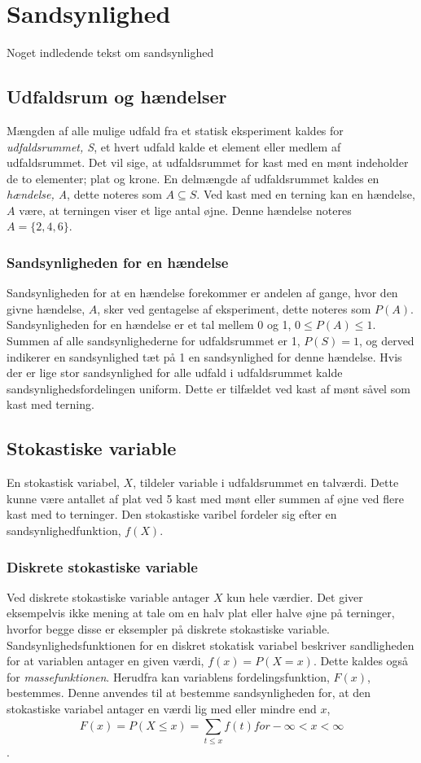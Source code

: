 \section{Sandsynlighed}
Noget indledende tekst om sandsynlighed

\subsection{Udfaldsrum og hændelser}
Mængden af alle mulige udfald fra et statisk eksperiment kaldes for \emph{udfaldsrummet,  S}, et hvert udfald kalde et element eller medlem af udfaldsrummet. Det vil sige, at udfaldsrummet for kast med en mønt indeholder de to elementer; plat og krone.
\newline
En delmængde af udfaldsrummet kaldes en \emph{hændelse, A}, dette noteres som $A \subseteq S$. Ved kast med en terning kan en hændelse, $A$ være, at terningen viser et lige antal øjne. Denne hændelse noteres $A=\{2,4,6\}$.


\subsubsection{Sandsynligheden for en hændelse}
Sandsynligheden for at en hændelse forekommer er andelen af gange, hvor den givne hændelse, $A$, sker ved gentagelse af eksperiment, dette noteres som $P(A)$. Sandsynligheden for en hændelse er et tal mellem 0 og 1, $0 \le P(A) \le 1$. Summen af alle sandsynlighederne for udfaldsrummet er 1, $P(S)=1$, og derved indikerer en sandsynlighed tæt på 1 en sandsynlighed for denne hændelse.
\newline
Hvis der er lige stor sandsynlighed for alle udfald i udfaldsrummet kalde sandsynlighedsfordelingen uniform. Dette er tilfældet ved kast af mønt såvel som kast med terning.


\subsection{Stokastiske variable}
En stokastisk variabel, $X$, tildeler variable i udfaldsrummet en talværdi. Dette kunne være antallet af plat ved 5 kast med mønt eller summen af øjne ved flere kast med to terninger. Den stokastiske varibel fordeler sig efter en sandsynlighedfunktion, $f(X)$.

\subsubsection{Diskrete stokastiske variable}
Ved diskrete stokastiske variable antager $X$ kun hele værdier. Det giver eksempelvis ikke mening at tale om en halv plat eller halve øjne på terninger, hvorfor begge disse er eksempler på diskrete stokastiske variable.
Sandsynlighedsfunktionen for en diskret stokatisk variabel beskriver sandligheden for at variablen antager en given værdi, $f(x)=P(X=x)$. Dette kaldes også for \emph{massefunktionen}.
Herudfra kan variablens fordelingsfunktion, $F(x)$, bestemmes. Denne anvendes til at bestemme sandsynligheden for, at den stokastiske variabel antager en værdi lig med eller mindre end $x$, $$F(x)=P(X \le x)=\sum_{t \le x}^{} f(t) for  -\infty < x < \infty$$.

